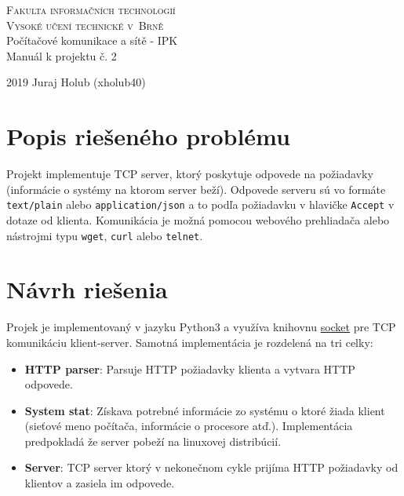 \documentclass[a4paper, 11pt]{article}
\begin{document}
\begin{titlepage}
	\begin{center}
		\Huge
		\textsc{Fakulta informačních technologií \\
			Vysoké učení technické v~Brně} \\
		{\LARGE
			Počítačové komunikace a sítě - IPK \\ 
			\medskip \Large{Manuál k projektu č. 2}
			}
	\end{center}
		\setlength{\parindent}{0.3em}
		{\Large 2019 \hfill
			Juraj Holub (xholub40)}
\end{titlepage}

\tableofcontents
\newpage

\section{Popis riešeného problému}
Projekt implementuje TCP server, ktorý poskytuje odpovede na požiadavky (informácie o systémy na ktorom server beží). Odpovede serveru sú vo formáte \texttt{text/plain} alebo \texttt{application/json} a to podľa požiadavku v hlavičke \texttt{Accept} v dotaze od klienta. Komunikácia je možná pomocou webového prehliadača alebo nástrojmi typu \texttt{wget}, \texttt{curl} alebo \texttt{telnet}.
\section{Návrh riešenia}
Projek je implementovaný v jazyku Python3 a využíva knihovnu \href{https://docs.python.org/3/library/socket.html}{socket} pre TCP komunikáciu klient-server. Samotná implementácia je rozdelená na tri celky:
\begin{itemize}
	\item \textbf{HTTP parser}: Parsuje HTTP požiadavky klienta a vytvara HTTP odpovede.
	\item \textbf{System stat}: Získava potrebné informácie zo systému o ktoré žiada klient (sieťové meno počítača, informácie o procesore atď.). Implementácia predpokladá že server pobeží na linuxovej distribúcií.
	\item \textbf{Server}: TCP server ktorý v nekonečnom cykle prijíma HTTP požiadavky od klientov a zasiela im odpovede.
\end{itemize}
\end{document}

